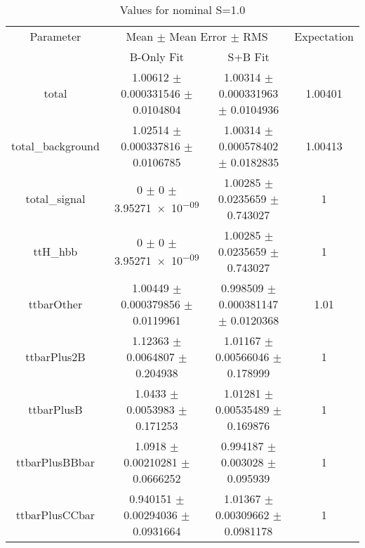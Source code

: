 \begin{table}
\centering
\caption{Values for nominal S=1.0}
\begin{tabular}{cccc}
\toprule
Parameter & \multicolumn{2}{c}{Mean $\pm$ Mean Error $\pm$ RMS} & Expectation\\
 & B-Only Fit & S+B Fit & \\
\midrule
total & \num{1.00612} $\pm$ \num{0.000331546} $\pm$ \num{0.0104804} & \num{1.00314} $\pm$ \num{0.000331963} $\pm$ \num{0.0104936} & \num{1.00401}\\
total\_background & \num{1.02514} $\pm$ \num{0.000337816} $\pm$ \num{0.0106785} & \num{1.00314} $\pm$ \num{0.000578402} $\pm$ \num{0.0182835} & \num{1.00413}\\
total\_signal & \num{0} $\pm$ \num{0} $\pm$ \num{3.95271e-09} & \num{1.00285} $\pm$ \num{0.0235659} $\pm$ \num{0.743027} & \num{1}\\
ttH\_hbb & \num{0} $\pm$ \num{0} $\pm$ \num{3.95271e-09} & \num{1.00285} $\pm$ \num{0.0235659} $\pm$ \num{0.743027} & \num{1}\\
ttbarOther & \num{1.00449} $\pm$ \num{0.000379856} $\pm$ \num{0.0119961} & \num{0.998509} $\pm$ \num{0.000381147} $\pm$ \num{0.0120368} & \num{1.01}\\
ttbarPlus2B & \num{1.12363} $\pm$ \num{0.0064807} $\pm$ \num{0.204938} & \num{1.01167} $\pm$ \num{0.00566046} $\pm$ \num{0.178999} & \num{1}\\
ttbarPlusB & \num{1.0433} $\pm$ \num{0.0053983} $\pm$ \num{0.171253} & \num{1.01281} $\pm$ \num{0.00535489} $\pm$ \num{0.169876} & \num{1}\\
ttbarPlusBBbar & \num{1.0918} $\pm$ \num{0.00210281} $\pm$ \num{0.0666252} & \num{0.994187} $\pm$ \num{0.003028} $\pm$ \num{0.095939} & \num{1}\\
ttbarPlusCCbar & \num{0.940151} $\pm$ \num{0.00294036} $\pm$ \num{0.0931664} & \num{1.01367} $\pm$ \num{0.00309662} $\pm$ \num{0.0981178} & \num{1}\\
\bottomrule
\end{tabular}
\end{table}